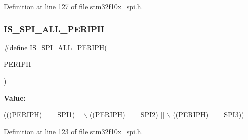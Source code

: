 Definition at line 127 of file stm32f10x\+\_\+spi.\+h.

\mbox{\label{group___s_p_i___exported___constants_gaf54f84a30a5914b54dbfdc186720d0ba}} 
\subsubsection{\texorpdfstring{I\+S\+\_\+\+S\+P\+I\+\_\+\+A\+L\+L\+\_\+\+P\+E\+R\+I\+PH}{IS\_SPI\_ALL\_PERIPH}}
{\footnotesize\ttfamily \#define I\+S\+\_\+\+S\+P\+I\+\_\+\+A\+L\+L\+\_\+\+P\+E\+R\+I\+PH(\begin{DoxyParamCaption}\item[{}]{P\+E\+R\+I\+PH }\end{DoxyParamCaption})}

{\bfseries Value\+:}
\begin{DoxyCode}
(((PERIPH) == \hyperlink{group___peripheral__declaration_gad483be344a28ac800be8f03654a9612f}{SPI1}) || \(\backslash\)
                                   ((PERIPH) == \hyperlink{group___peripheral__declaration_gaf2c3d8ce359dcfbb2261e07ed42af72b}{SPI2}) || \(\backslash\)
                                   ((PERIPH) == \hyperlink{group___peripheral__declaration_gab2339cbf25502bf562b19208b1b257fc}{SPI3}))
\end{DoxyCode}


Definition at line 123 of file stm32f10x\+\_\+spi.\+h.

